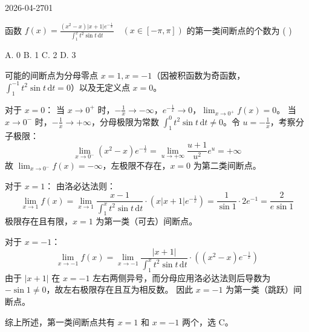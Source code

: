 \begin{mistake}{2026-04-27}{01}

\begin{problemcontent}
函数 \( f(x) = \frac{(x^2-x)|x+1|e^{-\frac{1}{x}}}{\int_{1}^{x} t^2 \sin t \, \mathrm{d}t} \quad (x \in [-\pi, \pi]) \) 的第一类间断点的个数为 ( )

A. 0 \quad B. 1 \quad C. 2 \quad D. 3
\end{problemcontent}

\begin{solutioncontent}
可能的间断点为分母零点 \(x=1, x=-1\)（因被积函数为奇函数，\(\int_{1}^{-1} t^2 \sin t \, \mathrm{d}t = 0\)）以及无定义点 \(x=0\)。

对于 \(x=0\)：
当 \(x \to 0^+\) 时，\(-\frac{1}{x} \to -\infty\)，\(e^{-\frac{1}{x}} \to 0\)，\(\lim_{x \to 0^+} f(x) = 0\)。
当 \(x \to 0^-\) 时，\(-\frac{1}{x} \to +\infty\)，分母极限为常数 \(\int_{1}^{0} t^2 \sin t \, \mathrm{d}t \neq 0\)。令 \(u=-\frac{1}{x}\)，考察分子极限：
\[
\lim_{x \to 0^-} (x^2-x)e^{-\frac{1}{x}} = \lim_{u \to +\infty} \frac{u+1}{u^2} e^u = +\infty
\]
故 \(\lim_{x \to 0^-} f(x) = -\infty\)，左极限不存在，\(x=0\) 为第二类间断点。

对于 \(x=1\)：
由洛必达法则：
\[
\lim_{x \to 1} f(x) = \lim_{x \to 1} \frac{x-1}{\int_{1}^{x} t^2 \sin t \, \mathrm{d}t} \cdot \left( x|x+1|e^{-\frac{1}{x}} \right) = \frac{1}{\sin 1} \cdot 2e^{-1} = \frac{2}{e\sin 1}
\]
极限存在且有限，\(x=1\) 为第一类（可去）间断点。

对于 \(x=-1\)：
\[
\lim_{x \to -1} f(x) = \lim_{x \to -1} \frac{|x+1|}{\int_{1}^{x} t^2 \sin t \, \mathrm{d}t} \cdot \left( (x^2-x)e^{-\frac{1}{x}} \right)
\]
由于 \(|x+1|\) 在 \(x=-1\) 左右两侧异号，而分母应用洛必达法则后导数为 \(-\sin 1 \neq 0\)，故左右极限存在且互为相反数。
因此 \(x=-1\) 为第一类（跳跃）间断点。

综上所述，第一类间断点共有 \(x=1\) 和 \(x=-1\) 两个，选 C。
\end{solutioncontent}


\end{mistake}
